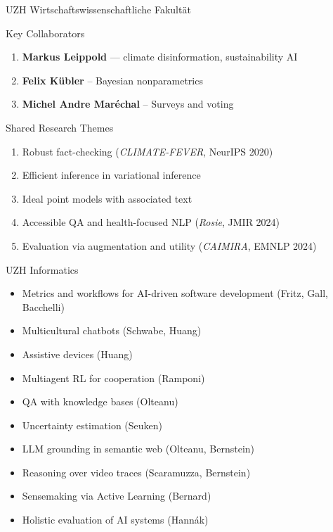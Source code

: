 \documentclass[compress]{beamer}
\begin{document}
\begin{frame}{UZH Wirtschaftswissenschaftliche Fakult\"at}
    \begin{block}{Key Collaborators}
      \begin{enumerate}
        \item \textbf{Markus Leippold} — climate disinformation, sustainability AI 
        \item \textbf{Felix K\"ubler} -- Bayesian nonparametrics
        \item \textbf{Michel Andre Mar\'echal} -- Surveys and voting 
      \end{enumerate}
    \end{block}

    \begin{block}{Shared Research Themes}
      \begin{enumerate}
        \item Robust fact-checking (\textit{CLIMATE-FEVER}, NeurIPS 2020) 
        \item Efficient inference in variational inference
        \item Ideal point models with associated text
        
         
        \item Accessible QA and health-focused NLP (\textit{Rosie}, JMIR 2024)  
        \item Evaluation via augmentation and utility (\textit{CAIMIRA}, EMNLP 2024)
      \end{enumerate}
    \end{block}
\end{frame}


\begin{frame}{UZH Informatics} 
		\begin{itemize}
\item Metrics and workflows for AI-driven software development (Fritz, Gall, Bacchelli)
			\item Multicultural chatbots (Schwabe, Huang)
\item Assistive devices (Huang)
			\item Multiagent RL for cooperation (Ramponi)
			\item QA with knowledge bases (Olteanu)
			\item Uncertainty estimation (Seuken)
\item LLM grounding in semantic web (Olteanu, Bernstein)
\item Reasoning over video traces (Scaramuzza, Bernstein)
\item Sensemaking via Active Learning (Bernard)
\item Holistic evaluation of AI systems (Hann\'ak)
		\end{itemize}	
	
\end{frame}
\end{document}
